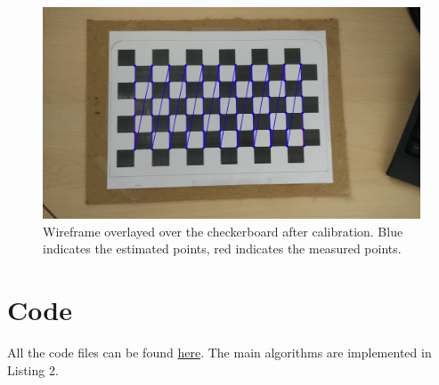 \documentclass[a4paper,11pt]{article}
\begin{document}
    \begin{figure}[H]
      \centering
      \includegraphics[scale=0.2]{checkerboard-phone-overlay}
      \caption{Wireframe overlayed over the checkerboard after calibration. Blue indicates the estimated points, red indicates the measured points.}
    \end{figure}
    
    \section{Code}
    
    All the code files can be found \href{https://drive.google.com/drive/folders/1aRjtnyrv5AyIaVY0OsNKUHnJqoDyX3oz?usp=sharing}{here}. The main algorithms are implemented in Listing 2.
    
    
    
    
    
    
    
\end{document}
